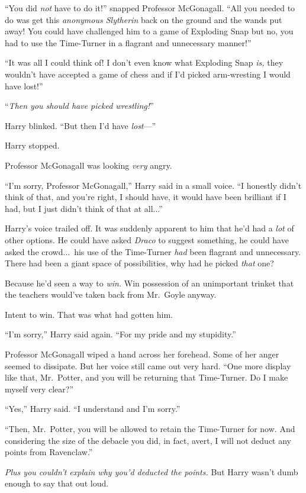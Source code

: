 “You did \emph{not} have to do it!” snapped Professor McGonagall. “All you needed to do was get this \emph{anonymous Slytherin} back on the ground and the wands put away! You could have challenged him to a game of Exploding Snap but no, you had to use the Time-Turner in a flagrant and unnecessary manner!”

“It was all I could think of! I don’t even know what Exploding Snap \emph{is,} they wouldn’t have accepted a game of chess and if I’d picked arm-wresting I would have lost!”

“\emph{Then you should have picked wrestling!}”

Harry blinked. “But then I’d have \emph{lost}—”

Harry stopped.

Professor McGonagall was looking \emph{very} angry.

“I’m sorry, Professor McGonagall,” Harry said in a small voice. “I honestly didn’t think of that, and you’re right, I should have, it would have been brilliant if I had, but I just didn’t think of that at all...”

Harry’s voice trailed off. It was suddenly apparent to him that he’d had a \emph{lot} of other options. He could have asked \emph{Draco} to suggest something, he could have asked the crowd...\ his use of the Time-Turner \emph{had} been flagrant and unnecessary. There had been a giant space of possibilities, why had he picked \emph{that} one?

Because he’d seen a way to \emph{win.} Win possession of an unimportant trinket that the teachers would’ve taken back from Mr.~Goyle anyway.

Intent to win. That was what had gotten him.

“I’m sorry,” Harry said again. “For my pride and my stupidity.”

Professor McGonagall wiped a hand across her forehead. Some of her anger seemed to dissipate. But her voice still came out very hard. “One more display like that, Mr.~Potter, and you will be returning that Time-Turner. Do I make myself very clear?”

“Yes,” Harry said. “I understand and I’m sorry.”

“Then, Mr.~Potter, you will be allowed to retain the Time-Turner for now. And considering the size of the debacle you did, in fact, avert, I will not deduct any points from Ravenclaw.”

\emph{Plus you couldn’t explain why you’d deducted the points.} But Harry wasn’t dumb enough to say that out loud.

